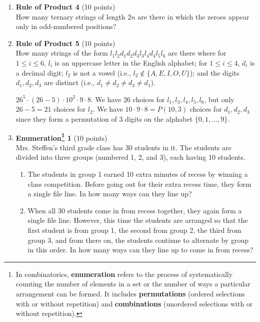 \begin{enumerate}
  \item \textbf{Rule of Product 4} (10 points)\\
  How many ternary strings of length $2n$ are there in which the zeroes appear only in odd-numbered positions?
  \begin{subanswer}
  \end{subanswer}

  \item \textbf{Rule of Product 5} (10 points)\\
  How many strings of the form $l_1 l_2 d_1 d_2 d_3 l_3 l_4 d_4 l_5 l_6$ are there where
  for $1 \leq i \leq 6$, $l_i$ is an uppercase letter in the English alphabet;
  for $1 \leq i \leq 4$, $d_i$ is a decimal digit;
  $l_2$ is not a vowel (i.e., $l_2 \notin \{A,E,I,O,U\}$); and
  the digits $d_1, d_2, d_3$ are distinct (i.e., $d_1 \neq d_2 \neq d_3 \neq d_1$).
  \begin{subanswer}
    $26^5 \cdot (26-5) \cdot 10^2 \cdot 9 \cdot 8$. We have 26 choices for $l_1, l_3, l_4, l_5, l_6$, but only $26-5=21$ choices for $l_2$. We have $10 \cdot 9 \cdot 8 = P(10,3)$ choices for $d_1, d_2, d_3$ since they form a permutation of 3 digits on the alphabet $\{0,1,\ldots,9\}$.
  \end{subanswer}

  \newpage

  \item \textbf{Enumeration\footnote{In combinatorics, 
  \textbf{enumeration} refers to the process of systematically counting the 
  number of elements in a set or the number of ways a particular arrangement 
  can be formed. It includes \textbf{permutations} (ordered selections with 
  or without repetition) and \textbf{combinations} (unordered selections 
  with or without repetition).} 1} (10 points)\\
  Mrs. Steffen's third grade class has 30 students in it. The students are divided into three groups (numbered 1, 2, and 3), each having 10 students.
  \begin{enumerate}[label=\alph*.]
    \item The students in group 1 earned 10 extra minutes of recess by winning a class competition. Before going out for their extra recess time, they form a single file line. In how many ways can they line up?
    \begin{subanswer}
    \end{subanswer}
    \item When all 30 students come in from recess together, they again form a single file line. However, this time the students are arranged so that the first student is from group 1, the second from group 2, the third from group 3, and from there on, the students continue to alternate by group in this order. In how many ways can they line up to come in from recess?
    \begin{subanswer}
    \end{subanswer}
  \end{enumerate}



\end{enumerate}
